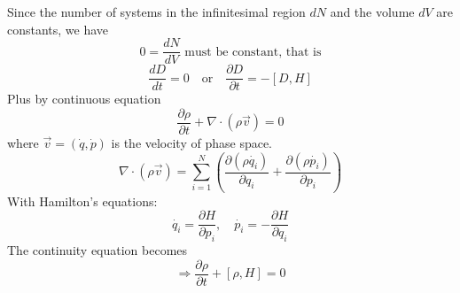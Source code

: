 \documentclass[12pt]{article}
\begin{document}
	Since the number of systems in the infinitesimal region $dN$ and the volume $dV$ are constants, we have
	\[
	0 = \frac{dN}{dV} \text{ must be constant, that is}
	\]
	\[
	\frac{dD}{dt} = 0 \quad \text{or} \quad \frac{\partial D}{\partial t} = -[D, H]
	\]
	Plus by continuous equation
	\[
	\frac{\partial \rho}{\partial t} + \nabla \cdot (\rho \vec{v}) = 0
	\]
	where $\vec{v} = (\dot{q}, \dot{p})$ is the velocity of phase space.
	\[
	\nabla \cdot (\rho \vec{v}) = \sum_{i=1}^{N} \left( \frac{\partial (\rho \dot{q_i})}{\partial q_i} + \frac{\partial (\rho \dot{p_i})}{\partial p_i} \right)
	\]
	With Hamilton's equations:
	\[
	\dot{q_i} = \frac{\partial H}{\partial p_i}, \quad \dot{p_i} = -\frac{\partial H}{\partial q_i}
	\]
	The continuity equation becomes
	\[
	\Rightarrow \frac{\partial \rho}{\partial t} + [\rho, H] = 0
	\]
	
\end{document}
